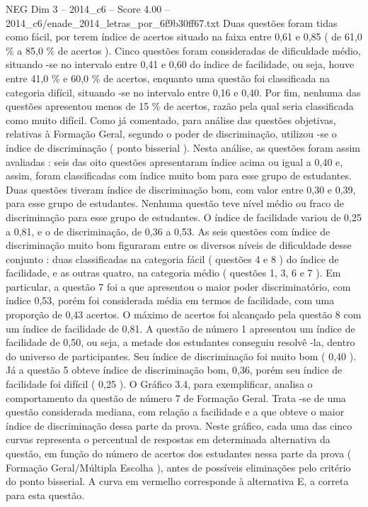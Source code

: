 \begin{textsample}{NEG Dim 3 – 2014\_c6 – Score 4.00 – 2014\_c6/enade\_2014\_letras\_por\_6f9b30ff67.txt}
Duas questões foram tidas como fácil, por terem índice de acertos situado na faixa entre 0,61 e 0,85 ( de 61,0 \% a 85,0 \% de acertos ).
Cinco questões foram consideradas de dificuldade médio, situando -se no intervalo entre 0,41 e 0,60 do índice de facilidade, ou seja, houve entre 41,0 \% e 60,0 \% de acertos, enquanto uma questão foi classificada na categoria difícil, situando -se no intervalo entre 0,16 e 0,40.
Por fim, nenhuma das questões apresentou menos de 15 \% de acertos, razão pela qual seria classificada como muito difícil.
Como já comentado, para análise das questões objetivas, relativas à Formação Geral, segundo o poder de discriminação, utilizou -se o índice de discriminação ( ponto bisserial ).
Nesta análise, as questões foram assim avaliadas : seis das oito questões apresentaram índice acima ou igual a 0,40 e, assim, foram classificadas com índice muito bom para esse grupo de estudantes.
Duas questões tiveram índice de discriminação bom, com valor entre 0,30 e 0,39, para esse grupo de estudantes.
Nenhuma questão teve nível médio ou fraco de discriminação para esse grupo de estudantes.
O índice de facilidade variou de 0,25 a 0,81, e o de discriminação, de 0,36 a 0,53.
As seis questões com índice de discriminação muito bom figuraram entre os diversos níveis de dificuldade desse conjunto : duas classificadas na categoria fácil ( questões 4 e 8 ) do índice de facilidade, e as outras quatro, na categoria médio ( questões 1, 3, 6 e 7 ).
Em particular, a questão 7 foi a que apresentou o maior poder discriminatório, com índice 0,53, porém foi considerada média em termos de facilidade, com uma proporção de 0,43 acertos.
O máximo de acertos foi alcançado pela questão 8 com um índice de facilidade de 0,81.
A questão de número 1 apresentou um índice de facilidade de 0,50, ou seja, a metade dos estudantes conseguiu resolvê -la, dentro do universo de participantes.
Seu índice de discriminação foi muito bom ( 0,40 ).
Já a questão 5 obteve índice de discriminação bom, 0,36, porém seu índice de facilidade foi difícil ( 0,25 ).
O Gráfico 3.4, para exemplificar, analisa o comportamento da questão de número 7 de Formação Geral.
Trata -se de uma questão considerada mediana, com relação a facilidade e a que obteve o maior índice de discriminação dessa parte da prova.
Neste gráfico, cada uma das cinco curvas representa o percentual de respostas em determinada alternativa da questão, em função do número de acertos dos estudantes nessa parte da prova ( Formação Geral/Múltipla Escolha ), antes de possíveis eliminações pelo critério do ponto bisserial.
A curva em vermelho corresponde à alternativa E, a correta para esta questão.

\end{textsample}
